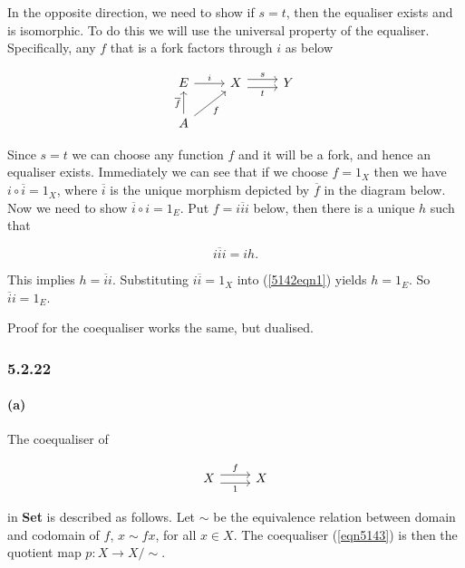 \documentclass{article}
\begin{document}
In the opposite direction, we need to show if $s=t$, then the equaliser exists and is isomorphic. To do this we will use the universal property of the equaliser. Specifically, any $f$ that is a fork factors through $i$ as below

\begin{equation*}
\begin{tikzcd}
  E \ar[r,"i"] & X \ar[r,shift left=.75ex,"s"]
  \ar[r,shift right=.75ex,swap,"t"] & Y \\
  A \ar[u,"\overline{f}"] \ar[ur,swap,"f"] &
\end{tikzcd}
\end{equation*}

Since $s=t$ we can choose any function $f$ and it will be a fork, and hence an equaliser exists. Immediately we can see that if we choose $f=1_X$ then we have $i \circ \overline{i}=1_X$, where $\overline{i}$ is the unique morphism depicted by $\overline{f}$ in the diagram below. Now we need to show $\overline{i} \circ i = 1_E$. Put $f=i\overline{i}i$ below, then there is a unique $h$ such that

\begin{equation}
  \label{5142eqn1}
  i\overline{i}i=ih.
\end{equation}

This implies $h=\overline{i}i$. Substituting $i\overline{i}=1_X$ into (\ref{5142eqn1}) yields $h=1_E$. So $\overline{i}i = 1_E$.

Proof for the coequaliser works the same, but dualised.

\subsubsection*{5.2.22}

\paragraph{(a)}

The coequaliser of

\begin{equation}
\label{eqn5143}
\begin{tikzcd}
  X \ar[r,shift left=.75ex,"f"]
    \ar[r,shift right=.75ex,swap,"1"] & X
\end{tikzcd}
\end{equation}

in \textbf{Set} is described as follows. Let $\sim$ be the equivalence relation between domain and codomain of $f$, $x \sim fx$, for all $x \in X$. The coequaliser (\ref{eqn5143}) is then the quotient map $p\colon X \rightarrow X/\sim$.
\end{document}
